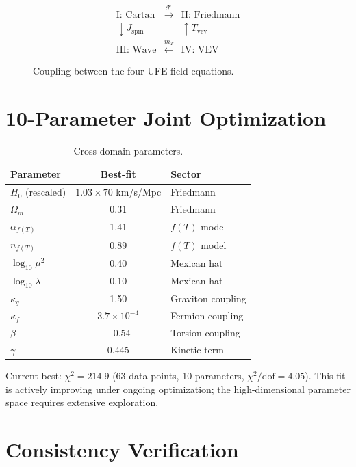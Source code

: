 \documentclass[twocolumn,prd,superscriptaddress,nofootinbib]{revtex4-2}
\begin{document}
\begin{figure}[h]
\centering
\begin{equation*}
\begin{array}{ccc}
\text{I: Cartan} & \xrightarrow{\mathcal{T}} & \text{II: Friedmann} \\
\downarrow J_\text{spin} & & \uparrow T_\text{vev} \\
\text{III: Wave} & \xleftarrow{m_T} & \text{IV: VEV}
\end{array}
\end{equation*}
\caption{Coupling between the four UFE field equations.}
\end{figure}

\section{10-Parameter Joint Optimization}

\begin{table}[h]
\caption{Cross-domain parameters.}
\begin{ruledtabular}
\begin{tabular}{lcl}
Parameter & Best-fit & Sector \\
\hline
$H_0$ (rescaled) & $1.03 \times 70$ km/s/Mpc & Friedmann \\
$\Omega_m$ & 0.31 & Friedmann \\
$\alpha_{f(T)}$ & 1.41 & $f(T)$ model \\
$n_{f(T)}$ & 0.89 & $f(T)$ model \\
$\log_{10}\mu^2$ & 0.40 & Mexican hat \\
$\log_{10}\lambda$ & 0.10 & Mexican hat \\
$\kappa_g$ & 1.50 & Graviton coupling \\
$\kappa_f$ & $3.7\times10^{-4}$ & Fermion coupling \\
$\beta$ & $-0.54$ & Torsion coupling \\
$\gamma$ & 0.445 & Kinetic term \\
\end{tabular}
\end{ruledtabular}
\end{table}

Current best: $\chi^2 = 214.9$ (63 data points, 10 parameters, $\chi^2/\text{dof} = 4.05$). This fit is actively improving under ongoing optimization; the high-dimensional parameter space requires extensive exploration.

\section{Consistency Verification}
\end{document}
